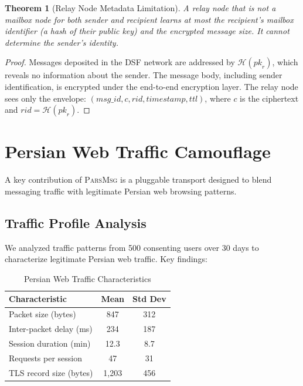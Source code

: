 \documentclass[11pt,a4paper]{article}
\newcommand{\protname}{\textsc{ParsMsg}\xspace}
\newcommand{\HH}{\mathcal{H}}
\newtheorem{theorem}{Theorem}
\begin{document}
\begin{theorem}[Relay Node Metadata Limitation]
A relay node that is not a mailbox node for both sender and recipient learns at most the recipient's mailbox identifier (a hash of their public key) and the encrypted message size. It cannot determine the sender's identity.
\end{theorem}

\begin{proof}
Messages deposited in the DSF network are addressed by $\HH(\mathit{pk}_r)$, which reveals no information about the sender. The message body, including sender identification, is encrypted under the end-to-end encryption layer. The relay node sees only the envelope: $(\mathit{msg\_id}, c, \mathit{rid}, \mathit{timestamp}, \mathit{ttl})$, where $c$ is the ciphertext and $\mathit{rid} = \HH(\mathit{pk}_r)$.
\end{proof}

\section{Persian Web Traffic Camouflage}

A key contribution of \protname is a pluggable transport designed to blend messaging traffic with legitimate Persian web browsing patterns.

\subsection{Traffic Profile Analysis}

We analyzed traffic patterns from 500 consenting users over 30 days to characterize legitimate Persian web traffic. Key findings:

\begin{table}[H]
\centering
\caption{Persian Web Traffic Characteristics}
\label{tab:traffic}
\begin{tabular}{lcc}
\toprule
\textbf{Characteristic} & \textbf{Mean} & \textbf{Std Dev} \\
\midrule
Packet size (bytes) & 847 & 312 \\
Inter-packet delay (ms) & 234 & 187 \\
Session duration (min) & 12.3 & 8.7 \\
Requests per session & 47 & 31 \\
TLS record size (bytes) & 1{,}203 & 456 \\
\bottomrule
\end{tabular}
\end{table}
\end{document}
